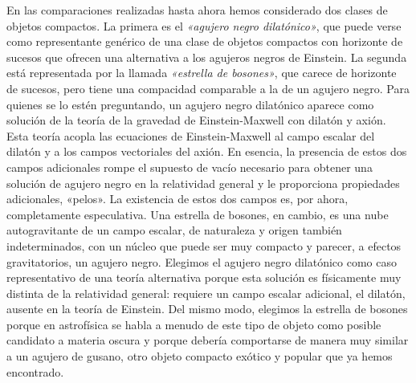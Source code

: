 En las comparaciones realizadas hasta ahora hemos considerado dos clases de objetos compactos. La primera es el \emph{«agujero negro dilatónico»}, que puede verse como representante genérico de una clase de objetos compactos con horizonte de sucesos que ofrecen una alternativa a los agujeros negros de Einstein. La segunda está representada por la llamada \emph{«estrella de bosones»}, que carece de horizonte de sucesos, pero tiene una compacidad comparable a la de un agujero negro. Para quienes se lo estén preguntando, un agujero negro dilatónico aparece como solución de la teoría de la gravedad de Einstein-Maxwell con dilatón y axión. Esta teoría acopla las ecuaciones de Einstein-Maxwell al campo escalar del dilatón y a los campos vectoriales del axión. En esencia, la presencia de estos dos campos adicionales rompe el supuesto de vacío necesario para obtener una solución de agujero negro en la relatividad general y le proporciona propiedades adicionales, «pelos». La existencia de estos dos campos es, por ahora, completamente especulativa. Una estrella de bosones, en cambio, es una nube autogravitante de un campo escalar, de naturaleza y origen también indeterminados, con un núcleo que puede ser muy compacto y parecer, a efectos gravitatorios, un agujero negro. Elegimos el agujero negro dilatónico como caso representativo de una teoría alternativa porque esta solución es físicamente muy distinta de la relatividad general: requiere un campo escalar adicional, el dilatón, ausente en la teoría de Einstein. Del mismo modo, elegimos la estrella de bosones porque en astrofísica se habla a menudo de este tipo de objeto como posible candidato a materia oscura y porque debería comportarse de manera muy similar a un agujero de gusano, otro objeto compacto exótico y popular que ya hemos encontrado.

